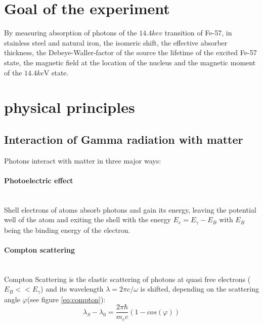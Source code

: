 \section{Goal of the experiment}
By measuring absorption of photons of the $14.4 kev$ transition of Fe-57, in stainless steel and natural iron, the isomeric shift, the effective absorber thickness, the  Debeye-Waller-factor of the source the lifetime of the excited Fe-57 state, the magnetic field at the location of the nucleus and the magnetic moment of the $14.4 ke$V state.
\section{physical principles}
\subsection{Interaction of Gamma radiation with matter}
Photons interact with matter in three major ways\cite{Demtröder}:
\paragraph{Photoelectric effect} \ \\
Shell electrons of atoms absorb photons and gain its energy, leaving the potential well of the atom and exiting the shell with the energy $E_e = E_\gamma-E_B$ with $E_B$ being the binding energy of the electron.
\paragraph{Compton scattering} \ \\
Compton Scattering is the elastic scattering of photons at quasi free  electrons ($E_B << E_\gamma$) and its wavelength $\lambda=2\pi c/\omega$ is shifted, depending on the scattering angle $\varphi$(see figure \ref*{eq:compton}):
\begin{equation}
\lambda_S -\lambda_0 = \frac{2 \pi \hbar}{m_e c}(1-cos(\varphi))
\label{eq:compton}
\end{equation}
